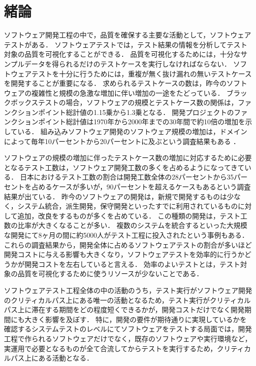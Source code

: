 \chapter{緒論}
ソフトウェア開発工程の中で，品質を確保する主要な活動として，ソフトウェアテストがある．
ソフトウェアテストでは，テスト結果の情報を分析してテスト対象の品質を可視化することができる．
品質を可視化するためには，十分なサンプルデータを得られるだけのテストケースを実行しなければならない．
ソフトウェアテストを十分に行うためには，重複が無く抜け漏れの無いテストケースを開発することが重要になる．
求められるテストケースの数は，昨今のソフトウェアの複雑性と規模の急激な増加に伴い増加の一途をたどっている．
ブラックボックステストの場合，ソフトウェアの規模とテストケース数の関係は，ファンクションポイント総計値の1.15乗から1.3乗となる\cite{jones1998estimating}．
開発プロジェクトのファンクションポイント総計値は1970年から2000年までの30年間で約10倍の増加を示している\cite{longstreet2000}．
組み込みソフトウェア開発のソフトウェア規模の増加は，ドメインによって毎年10パーセントから20パーセントに及ぶという調査結果もある \cite{jones2009}．

ソフトウェアの規模の増加に伴ったテストケース数の増加に対応するために必要となるテスト工数は，ソフトウェア開発工数の多くを占めるようになってきている．
日本におけるテスト工数の割合は開発工数全体の28パーセントから35パーセントを占めるケースが多いが，90パーセントを超えるケースもあるという調査結果が出ている\cite{IPA2015}．
昨今のソフトウェアの開発は，新規で開発するものは少なく，システム統合，派生開発，保守開発といったすでに利用されているものに対して追加，改良をするものが多くを占めている．
この種類の開発は，テスト工数の比率が大きくなることが多い．
複数のシステムを統合するといった大規模な開発にて8ヶ月の間に約5000人がテスト工程に投入されたという事例もある\cite{MTBUDay2}．
これらの調査結果から，開発全体に占めるソフトウェアテストの割合が多いほど開発コストに与える影響も大きくなり，ソフトウェアテストを効率的に行うかどうかが開発コストを左右していると言える．
効率のよいテストとは，テスト対象の品質を可視化するために使うリソースが少ないことである．

ソフトウェアテスト工程全体の中の活動のうち，テスト実行がソフトウェア開発のクリティカルパス上にある唯一の活動となるため，テスト実行がクリティカルパス上に滞在する期間をどの程度短くできるかが，開発コストだけでなく開発期間にも大きく影響を及ぼす．
特に，開発の要件が期待通りに実現しているかを確認するシステムテストのレベルにてソフトウェアをテストする局面では，開発工程で作られるソフトウェアだけでなく，既存のソフトウェアや実行環境など，実運用で必要となるものが全て合流してからテストを実行するため，クリティカルパス上にある活動となる．

